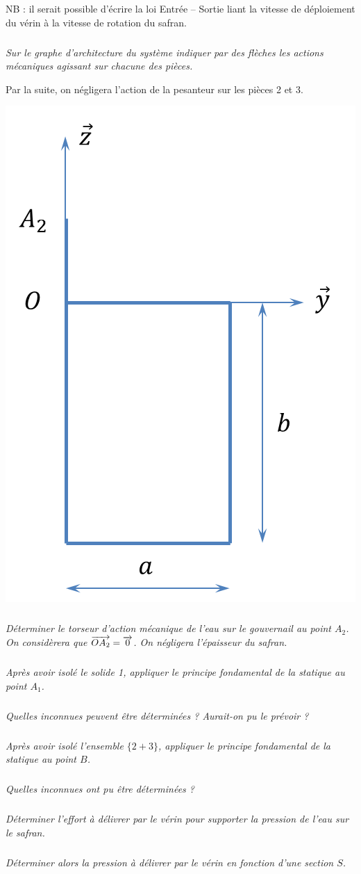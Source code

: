 \documentclass[10pt,fleqn]{article} %
\begin{document}
\begin{multicols}{2}
NB : il serait possible d'écrire la loi Entrée -- Sortie liant la vitesse de déploiement du vérin à la vitesse de rotation du safran.

\subparagraph{}
\textit{Sur le graphe d'architecture du système indiquer par des flèches les actions mécaniques agissant sur chacune des pièces.}

Par la suite, on négligera l'action de la pesanteur sur les pièces 2 et 3. 
\begin{center}
\includegraphics[width=.6\linewidth]{images/safran3}
\end{center}

\vspace{.5cm}

\subparagraph{}
\textit{Déterminer le torseur d'action mécanique de l'eau sur le gouvernail au point $A_2$. On considèrera que $\overrightarrow{OA_2}=\overrightarrow{0}$. On négligera l'épaisseur du safran.} 

\subparagraph{}
\textit{Après avoir isolé le solide 1, appliquer le principe fondamental de la statique au point $A_1$.}

\subparagraph{}
\textit{Quelles inconnues peuvent être déterminées ? Aurait-on pu le prévoir ?}

\subparagraph{}
\textit{Après avoir isolé l'ensemble $\{2+3\}$, appliquer le principe fondamental de la statique au point $B$.}


\subparagraph{}
\textit{Quelles inconnues ont pu être déterminées ?}


\subparagraph{}
\textit{Déterminer l'effort à délivrer par le vérin pour supporter la pression de l'eau sur le safran.}

\subparagraph{}
\textit{Déterminer alors la pression à délivrer par le vérin en fonction d'une section $S$.}



\end{multicols}
\end{document}
